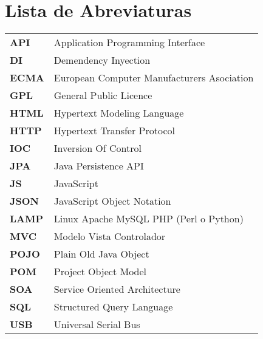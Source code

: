 \chapter*{Lista de Abreviaturas}
\begin{table*}[h!]
    \begin{center}
        \begin{tabular}{ll}
            \textbf{API} & Application Programming Interface\\
            \textbf{DI} & Demendency Inyection\\
            \textbf{ECMA} & European Computer Manufacturers Asociation\\
            \textbf{GPL} & General Public Licence\\
            \textbf{HTML} & Hypertext Modeling Language\\
            \textbf{HTTP} & Hypertext Transfer Protocol\\
            \textbf{IOC} & Inversion Of Control\\
            \textbf{JPA} & Java Persistence API\\
            \textbf{JS} & JavaScript\\
            \textbf{JSON} & JavaScript Object Notation\\
            \textbf{LAMP} & Linux Apache MySQL PHP (Perl o Python)\\
            \textbf{MVC} & Modelo Vista Controlador\\
            \textbf{POJO} & Plain Old Java Object\\
            \textbf{POM} & Project Object Model\\
            \textbf{SOA} & Service Oriented Architecture\\
            \textbf{SQL} & Structured Query Language\\
            \textbf{USB} & Universal Serial Bus\\
        \end{tabular}
    \end{center}
\end{table*}